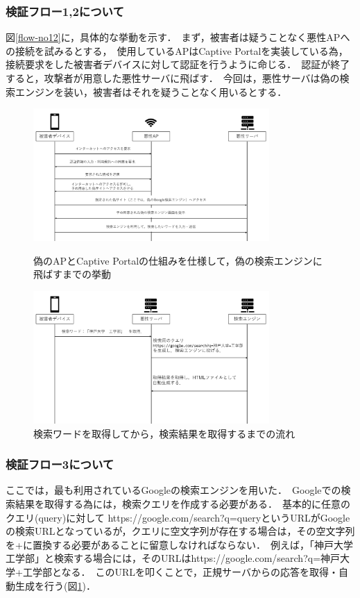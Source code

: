 \documentclass[dvipdfmx,twocolumn]{jsarticle}
\begin{document}
            \subsubsection{検証フロー1,2について}
                図\ref{flow-no12}に，具体的な挙動を示す．\
                まず，被害者は疑うことなく悪性APへの接続を試みるとする，\
                使用しているAPはCaptive Portalを実装している為，接続要求をした被害者デバイスに対して認証を行うように命じる．\
                認証が終了すると，攻撃者が用意した悪性サーバに飛ばす．\
                今回は，悪性サーバは偽の検索エンジンを装い，被害者はそれを疑うことなく用いるとする．\
                \begin{figure}[t]
                    \centering
                    \includegraphics[width=9cm]{img/vc-vf-1-2.png}
                    \caption{偽のAPとCaptive Portalの仕組みを仕様して，偽の検索エンジンに飛ばすまでの挙動}
                    \label{flow-no12}
                    \includegraphics[width=9cm]{img/vc-vf-3.png}
                    \caption{検索ワードを取得してから，検索結果を取得するまでの流れ}
                    \label{flow-no3} 
                \end{figure}
            \subsubsection{検証フロー3について}
                ここでは，最も利用されているGoogleの検索エンジンを用いた．\
                Googleでの検索結果を取得する為には，検索クエリを作成する必要がある．\
                基本的に任意のクエリ(query)に対して https://google.com/search?q=queryというURLがGoogleの検索URLとなっているが，クエリに空文字列が存在する場合は，その空文字列を+に置換する必要があることに留意しなければならない．\
                例えば，「神戸大学　工学部」と検索する場合には，そのURLはhttps://google.com/search?q=神戸大学+工学部となる．\
                このURLを叩くことで，正規サーバからの応答を取得・自動生成を行う(図\ref{flow-no3})．\\
\end{document}
